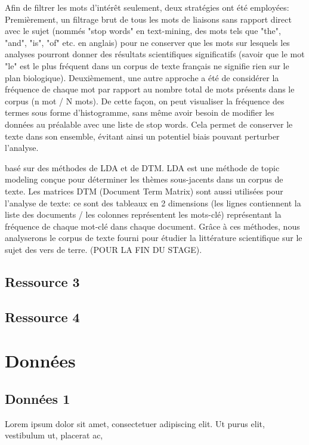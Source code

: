 \documentclass{book}
\begin{document}
Afin de filtrer les mots d'intérêt seulement, deux stratégies ont été
employées: Premièrement, un filtrage brut de tous les mots de liaisons sans
rapport direct avec le sujet (nommés "stop words" en text-mining, des mots tels
que "the", "and", "is", "of" etc. en anglais) pour ne conserver que les mots
sur lesquels les analyses pourront donner des résultats scientifiques
significatifs (savoir que le mot "le" est le plus fréquent dans un corpus de
texte français ne signifie rien sur le plan biologique). Deuxièmement, une
autre approche a été de considérer la fréquence de chaque mot par rapport au
nombre total de mots présents dans le corpus (n mot / N mots). De cette façon,
on peut visualiser la fréquence des termes sous forme d'histogramme, sans même
avoir besoin de modifier les données au préalable avec une liste de stop words.
Cela permet de conserver le texte dans son ensemble, évitant ainsi un potentiel
biais pouvant perturber l'analyse.

basé sur des méthodes de LDA et de DTM. LDA est une méthode de topic modeling
conçue pour déterminer les thèmes sous-jacents dans un corpus de texte. Les
matrices DTM (Document Term Matrix) sont aussi utilisées pour l'analyse de
texte: ce sont des tableaux en 2 dimensions (les lignes contiennent la liste
des documents / les colonnes représentent les mots-clé) représentant la
fréquence de chaque mot-clé dans chaque document. Grâce à ces méthodes, nous
analyserons le corpus de texte fourni pour étudier la littérature scientifique
sur le sujet des vers de terre. (POUR LA FIN DU STAGE).

\subsection{Ressource 3}
\noindent

\subsection{Ressource 4}
\noindent

\section{Données}
\noindent

\subsection{Données 1}
\noindent
Lorem ipsum dolor sit amet, consectetuer adipiscing elit. Ut purus elit,
vestibulum ut, placerat ac,
\end{document}
